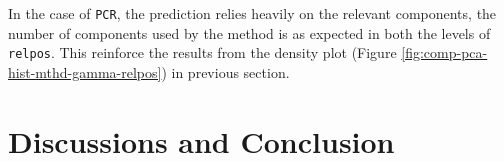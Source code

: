 \documentclass[12pt,3p,authoryear]{elsarticle}
\begin{document}
In the case of \texttt{PCR}, the prediction relies heavily on the
relevant components, the number of components used by the method is as
expected in both the levels of \texttt{relpos}. This reinforce the
results from the density plot (Figure
\ref{fig:comp-pca-hist-mthd-gamma-relpos}) in previous section.

\hypertarget{discussions-and-conclusion}{%
\section{Discussions and Conclusion}\label{discussions-and-conclusion}}

\hypertarget{refs}{}

\hypertarget{appendix-appendix-a}{%
\appendix}



\renewcommand\refname{References}

\end{document}
